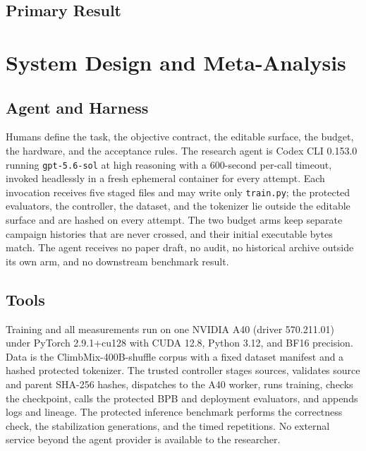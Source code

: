 \documentclass{article}
\begin{document}
\subsection{Primary Result}

\label{partoneend}

\clearpage
\section{System Design and Meta-Analysis}\label{parttwo}

\subsection{Agent and Harness}
Humans define the task, the objective contract, the editable surface, the budget, the hardware, and the acceptance rules. The research agent is Codex CLI 0.153.0 running \texttt{gpt-5.6-sol} at high reasoning with a 600-second per-call timeout, invoked headlessly in a fresh ephemeral container for every attempt. Each invocation receives five staged files and may write only \texttt{train.py}; the protected evaluators, the controller, the dataset, and the tokenizer lie outside the editable surface and are hashed on every attempt. The two budget arms keep separate campaign histories that are never crossed, and their initial executable bytes match. The agent receives no paper draft, no audit, no historical archive outside its own arm, and no downstream benchmark result.

\subsection{Tools}
Training and all measurements run on one NVIDIA A40 (driver 570.211.01) under PyTorch 2.9.1+cu128 with CUDA 12.8, Python 3.12, and BF16 precision. Data is the ClimbMix-400B-shuffle corpus with a fixed dataset manifest and a hashed protected tokenizer. The trusted controller stages sources, validates source and parent SHA-256 hashes, dispatches to the A40 worker, runs training, checks the checkpoint, calls the protected BPB and deployment evaluators, and appends logs and lineage. The protected inference benchmark performs the correctness check, the stabilization generations, and the timed repetitions. No external service beyond the agent provider is available to the researcher.
\end{document}
